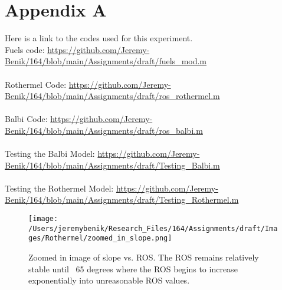 \documentclass{article}
\begin{document}
\newpage



\newpage
\section{Appendix A}

Here is a link to the codes used for this experiment. \\
Fuels code: \url{https://github.com/Jeremy-Benik/164/blob/main/Assignments/draft/fuels_mod.m} \\
\\
Rothermel Code:  \url{https://github.com/Jeremy-Benik/164/blob/main/Assignments/draft/ros_rothermel.m} \\
\\
Balbi Code: \url{https://github.com/Jeremy-Benik/164/blob/main/Assignments/draft/ros_balbi.m} \\
\\
Testing the Balbi Model: \url{https://github.com/Jeremy-Benik/164/blob/main/Assignments/draft/Testing_Balbi.m}\\
\\
Testing the Rothermel Model: \url{https://github.com/Jeremy-Benik/164/blob/main/Assignments/draft/Testing_Rothermel.m}\\
\begin{figure}[!h]
\centering
  \texttt{[image: /Users/jeremybenik/Research\_Files/164/Assignments/draft/Images/Rothermel/zoomed\_in\_slope.png]}
  \caption{Zoomed in image of slope vs. ROS. The ROS remains relatively stable until ~65 degrees where the ROS begins to increase exponentially into unreasonable ROS values.}
  \label{slope_zoomed}
\end{figure}
\end{document}
